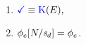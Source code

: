 \begin{minipage}[t]{.55\textwidth}
\begin{enumerate}[resume,topsep=0pt,label=(\textsc{w}\arabic*),ref=\textsc{w}\arabic*]
  \item \label {write-term-ca-addr}
    \begin{math}
      \aTerm \riff
      \kappaE{},
    \end{math}
    \item \label{write-phi-ca-addr}
      $\phi_e[N/\mathit{s}_{d}]=\phi_e$.
  \end{enumerate}
\end{minipage}

